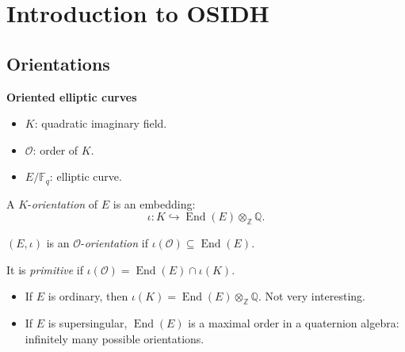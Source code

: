 \documentclass[10pt]{beamer}
\theoremstyle{plain}
\theoremstyle{definition}
\newcommand{\Z}{\mathbb{Z}}
\newcommand{\Q}{\mathbb{Q}}
\newcommand{\F}{\mathbb{F}}
\newcommand{\mO}{\mathcal{O}}
\renewcommand{\(}{\left(}
\renewcommand{\)}{\right)}
\DeclareMathOperator{\End}{End}
\begin{document}
\section{Introduction to OSIDH}

\subsection{Orientations}

\begin{frame}
\textbf{Oriented elliptic curves}

\vspace{0.5cm}

\begin{itemize}
\item $K$: quadratic imaginary field.
\item $\mO$: order of $K$.
\item $E/\F_q$: elliptic curve.
\end{itemize}

\begin{definition}
A $K$-\emph{orientation} of $E$ is an embedding: 
\[\iota : K\hookrightarrow \End(E)\otimes_\Z\Q.\]

$(E, \iota)$ is an $\mO$-\emph{orientation} if $\iota(\mO)\subseteq \End(E)$.  

It is \emph{primitive} if $\iota(\mO)=\End(E)\cap\iota(K)$.
\end{definition}

\pause

\begin{itemize}
\item If $E$ is ordinary, then $\iota(K)=\End(E)\otimes_\Z\Q$. Not very interesting.

\pause
\item If $E$ is supersingular, $\End(E)$ is a maximal order in a quaternion algebra: infinitely many possible orientations.
\end{itemize}

\end{frame}
\end{document}
